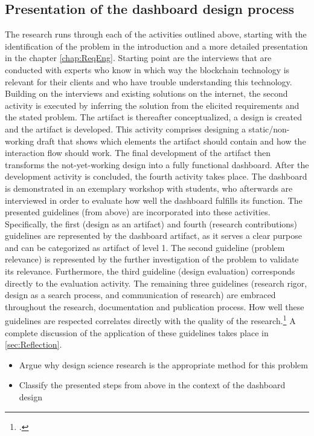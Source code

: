 \subsection{Presentation of the dashboard design process}
The research runs through each of the activities outlined above, starting with the identification of the problem in the introduction and a more detailed presentation in the chapter \ref{chap:ReqEng}. Starting point are the interviews that are conducted with experts who know in which way the blockchain technology is relevant for their clients and who have trouble understanding this technology. Building on the interviews and existing solutions on the internet, the second activity is executed by inferring the solution from the elicited requirements and the stated problem. The artifact is thereafter conceptualized, a design is created and the artifact is developed. This activity comprises designing a static/non-working draft that shows which elements the artifact should contain and how the interaction flow should work. The final development of the artifact then transforms the not-yet-working design into a fully functional dashboard. After the development activity is concluded, the fourth activity takes place. The dashboard is demonstrated in an exemplary workshop with students, who afterwards are interviewed in order to evaluate how well the dashboard fulfills its function. The presented guidelines (from above) are incorporated into these activities. Specifically, the first (design as an artifact) and fourth (research contributions) guidelines are represented by the dashboard artifact, as it serves a clear purpose and can be categorized as artifact of level 1. The second guideline (problem relevance) is represented by the further investigation of the problem to validate its relevance. Furthermore, the third guideline (design evaluation) corresponds directly to the evaluation activity. The remaining three guidelines (research rigor, design as a search process, and communication of research) are embraced throughout the research, documentation and publication process. How well these guidelines are respected correlates directly with the quality of the research.\footcite[Cf.][p.19]{HevnerDesignResearchInformation2010} A complete discussion of the application of these guidelines takes place in \ref{sec:Reflection}.


\begin{itemize}
    \item Argue why design science research is the appropriate method for this problem
    \item Classify the presented steps from above in the context of the dashboard design
\end{itemize}